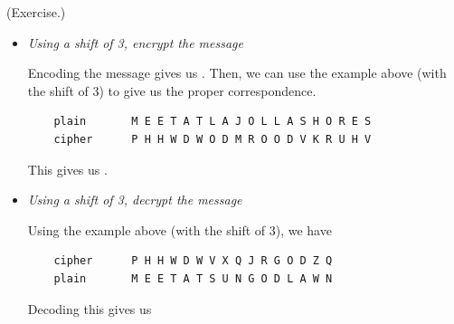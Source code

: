 \documentclass[letterpaper]{article}
\begin{document}
\begin{mdframed}
    (Exercise.) 
    \begin{itemize}
        \item \emph{Using a shift of 3, encrypt the message }
        \begin{mdframed}
            Encoding the message gives us . Then, we can use the example above (with the shift of 3) to give us the proper correspondence.
            \begin{verbatim}
    plain       M E E T A T L A J O L L A S H O R E S
    cipher      P H H W D W O D M R O O D V K R U H V\end{verbatim}
            This gives us .
        \end{mdframed}
        \item \emph{Using a shift of 3, decrypt the message }
        \begin{mdframed}
            Using the example above (with the shift of 3), we have
            \begin{verbatim}
    cipher      P H H W D W V X Q J R G O D Z Q
    plain       M E E T A T S U N G O D L A W N\end{verbatim}
            Decoding this gives us 
        \end{mdframed}
    \end{itemize}
\end{mdframed}
\end{document}

